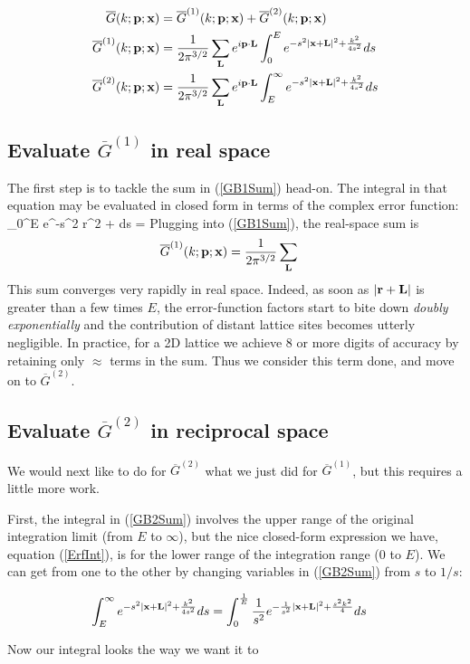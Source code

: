 \documentclass[letterpaper]{article}
\newcommand{\GB}{\overline{G}}
\begin{document}
\begin{align}
\GB(k; \vb p; \vb x) 
 &= \GB^{(1)}(k; \vb p; \vb x) 
   +\GB^{(2)}(k; \vb p; \vb x) 
\label{GBDecomposition}
\\
\GB^{(1)}(k; \vb p; \vb x) 
&= \frac{1}{2\pi^{3/2}}
   \sum_{\vb L} e^{i\vb p \cdot \vb L} \int_0^E e^{-s^2 |\vb x+\vb L|^2 + \frac{k^2}{4s^2}} ds
\label{GB1Sum}
\\
\GB^{(2)}(k; \vb p; \vb x) 
&= \frac{1}{2\pi^{3/2}}
   \sum_{\vb L} e^{i\vb p \cdot \vb L} \int_E^\infty e^{-s^2 |\vb x + \vb L|^2 + \frac{k^2}{4s^2}} ds
\label{GB2Sum}
\end{align}

\subsection*{Evaluate $\GB^{(1)}$ in real space} 

The first step is to tackle the sum in (\ref{GB1Sum}) head-on. 
The integral in that equation may be evaluated in closed form in terms of
the complex error function:
{
   \int_0^E e^{-s^2 r^2 + } ds
   = 
}
Plugging into (\ref{GB1Sum}), the real-space sum is 
\begin{align*}
\GB^{(1)}(k; \vb p; \vb x) 
&= \frac{1}{2\pi^{3/2}}
   \sum_{\vb L}
\end{align*}
This sum converges very rapidly in real space. Indeed, as soon as 
$|\mathbf{r} + \mathbf{L}|$ is greater than a few times $E$, the error-function
factors start to bite down \textit{doubly exponentially} and
the contribution of distant lattice sites becomes utterly negligible.
In practice, for a 2D lattice we achieve 8 or more digits of accuracy 
by retaining only $\approx$ terms in the sum.
Thus we consider this term done, and move on to $\GB^{(2)}.$ 

\subsection*{Evaluate $\GB^{(2)}$ in reciprocal space} 

We would next like to do for $\GB^{(2)}$ what we just did for $\GB^{(1)}$,
but this requires a little more work. 

First, the integral in (\ref{GB2Sum}) involves the upper range of the 
original integration limit (from $E$ to $\infty$), but the nice closed-form 
expression we have, equation (\ref{ErfInt}), is for the lower range 
of the integration range (0 to $E$). We can get from one to the other 
by changing variables in (\ref{GB2Sum}) from $s$ to $1/s$: 

\begin{align*}
\int_E^\infty e^{-s^2 |\mathbf{x} + \mathbf{L}|^2 + \frac{k^2}{4s^2}} ds
&= \int_0^\frac{1}{E} \frac{1}{s^2} e^{-\frac{1}{s^2} |\mathbf{x} + \mathbf{L}|^2 + \frac{s^2 k^2}{4}} ds
\label{GB2Sum2}
\end{align*}

Now our integral looks the way we want it to
\end{document}
